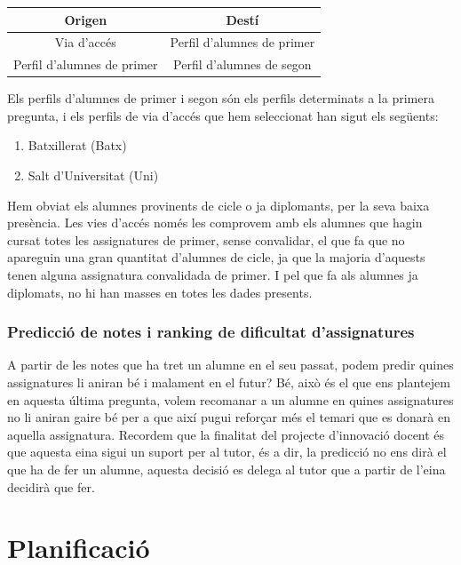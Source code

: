 \documentclass[12pt,a4paper,catalan]{article}
\begin{document}
\begin{table}[h]
\centering
\begin{tabular}{@{}cc@{}}
\toprule
{\bf Origen}               & {\bf Destí}                \\ \midrule
Via d'accés                & Perfil d'alumnes de primer \\
Perfil d'alumnes de primer & Perfil d'alumnes de segon  \\ \bottomrule
\end{tabular}
\end{table}

Els perfils d'alumnes de primer i segon són els perfils determinats a la primera pregunta, i els perfils de via d'accés que hem seleccionat han sigut els següents:
\begin{enumerate}
	\item Batxillerat (Batx)
	\item Salt d'Universitat (Uni)
\end{enumerate}

Hem obviat els alumnes provinents de cicle o ja diplomants, per la seva baixa presència. Les vies d'accés només les comprovem amb els alumnes que hagin cursat totes les assignatures de primer, sense convalidar, el que fa que no apareguin una gran quantitat d'alumnes de cicle, ja que la majoria d'aquests tenen alguna assignatura convalidada de primer. I pel que fa als alumnes ja diplomats, no hi han masses en totes les dades presents.

\subsubsection{Predicció de notes i ranking de dificultat d'assignatures}
A partir de les notes que ha tret un alumne en el seu passat, podem predir quines assignatures li aniran bé i malament en el futur? Bé, això és el que ens plantejem en aquesta última pregunta, volem recomanar a un alumne en quines assignatures no li aniran gaire bé per a que així pugui reforçar més el temari que es donarà en aquella assignatura. Recordem que la finalitat del projecte d'innovació docent és que aquesta eina sigui un suport per al tutor, és a dir, la predicció no ens dirà el que ha de fer un alumne, aquesta decisió es delega al tutor que a partir de l'eina decidirà que fer.
\newpage

\section{Planificació}
\end{document}
